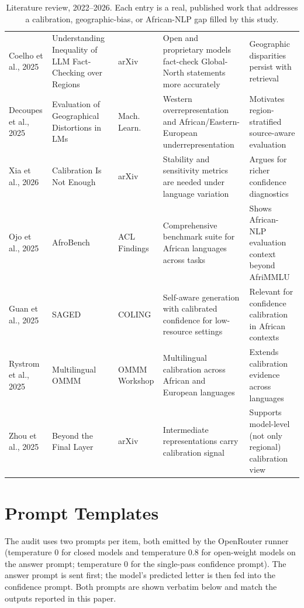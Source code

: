 \documentclass[11pt]{article}
\begin{document}
\begin{table}[t]
\begin{tabular}{@{}p{2.0cm}p{3.9cm}p{1.4cm}p{4.0cm}p{3.6cm}@{}}
Coelho et al., 2025 \cite{coelho2025inequality} & Understanding Inequality of LLM Fact-Checking over Regions & arXiv & Open and proprietary models fact-check Global-North statements more accurately & Geographic disparities persist with retrieval \\
Decoupes et al., 2025 \cite{decoupes2025geographical} & Evaluation of Geographical Distortions in LMs & Mach. Learn. & Western overrepresentation and African/Eastern-European underrepresentation & Motivates region-stratified source-aware evaluation \\
Xia et al., 2026 \cite{xia2026calibration} & Calibration Is Not Enough & arXiv & Stability and sensitivity metrics are needed under language variation & Argues for richer confidence diagnostics \\
Ojo et al., 2025 \cite{ojo2025afrobench} & AfroBench & ACL Findings & Comprehensive benchmark suite for African languages across tasks & Shows African-NLP evaluation context beyond AfriMMLU \\
Guan et al., 2025 \cite{guan2025saged} & SAGED & COLING & Self-aware generation with calibrated confidence for low-resource settings & Relevant for confidence calibration in African contexts \\
Rystrom et al., 2025 \cite{rystrom2025multilingual} & Multilingual OMMM & OMMM Workshop & Multilingual calibration across African and European languages & Extends calibration evidence across languages \\
Zhou et al., 2025 \cite{zhou2025beyond} & Beyond the Final Layer & arXiv & Intermediate representations carry calibration signal & Supports model-level (not only regional) calibration view \\
\bottomrule
\end{tabular}
\caption{Literature review, 2022--2026. Each entry is a real, published work that addresses a calibration, geographic-bias, or African-NLP gap filled by this study.}
\label{tab:related}
\end{table}

\section{Prompt Templates}
\label{app:prompts}

The audit uses two prompts per item, both emitted by the OpenRouter runner (temperature 0 for closed models and temperature 0.8 for open-weight models on the answer prompt; temperature 0 for the single-pass confidence prompt). The answer prompt is sent first; the model's predicted letter is then fed into the confidence prompt. Both prompts are shown verbatim below and match the outputs reported in this paper.
\end{document}
